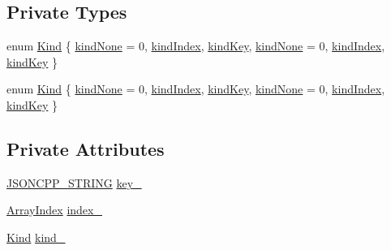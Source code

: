 \subsection*{Private Types}
\begin{DoxyCompactItemize}
\item 
enum \hyperlink{class_json_1_1_path_argument_a2420bbad778573c147e578701b84d9b9}{Kind} \{ \newline
\hyperlink{class_json_1_1_path_argument_a2420bbad778573c147e578701b84d9b9a6db9d0ef9272eb98cb1a7cdad9bf1389}{kind\+None} = 0, 
\hyperlink{class_json_1_1_path_argument_a2420bbad778573c147e578701b84d9b9a8c821a3ddf6dca946359db0159c1f960}{kind\+Index}, 
\hyperlink{class_json_1_1_path_argument_a2420bbad778573c147e578701b84d9b9aac79cd2662fad72c6a5d77e69bc78ae5}{kind\+Key}, 
\hyperlink{class_json_1_1_path_argument_a2420bbad778573c147e578701b84d9b9a6db9d0ef9272eb98cb1a7cdad9bf1389}{kind\+None} = 0, 
\newline
\hyperlink{class_json_1_1_path_argument_a2420bbad778573c147e578701b84d9b9a8c821a3ddf6dca946359db0159c1f960}{kind\+Index}, 
\hyperlink{class_json_1_1_path_argument_a2420bbad778573c147e578701b84d9b9aac79cd2662fad72c6a5d77e69bc78ae5}{kind\+Key}
 \}
\item 
enum \hyperlink{class_json_1_1_path_argument_a2420bbad778573c147e578701b84d9b9}{Kind} \{ \newline
\hyperlink{class_json_1_1_path_argument_a2420bbad778573c147e578701b84d9b9a6db9d0ef9272eb98cb1a7cdad9bf1389}{kind\+None} = 0, 
\hyperlink{class_json_1_1_path_argument_a2420bbad778573c147e578701b84d9b9a8c821a3ddf6dca946359db0159c1f960}{kind\+Index}, 
\hyperlink{class_json_1_1_path_argument_a2420bbad778573c147e578701b84d9b9aac79cd2662fad72c6a5d77e69bc78ae5}{kind\+Key}, 
\hyperlink{class_json_1_1_path_argument_a2420bbad778573c147e578701b84d9b9a6db9d0ef9272eb98cb1a7cdad9bf1389}{kind\+None} = 0, 
\newline
\hyperlink{class_json_1_1_path_argument_a2420bbad778573c147e578701b84d9b9a8c821a3ddf6dca946359db0159c1f960}{kind\+Index}, 
\hyperlink{class_json_1_1_path_argument_a2420bbad778573c147e578701b84d9b9aac79cd2662fad72c6a5d77e69bc78ae5}{kind\+Key}
 \}
\end{DoxyCompactItemize}
\subsection*{Private Attributes}
\begin{DoxyCompactItemize}
\item 
\hyperlink{config_8h_a1e723f95759de062585bc4a8fd3fa4be}{J\+S\+O\+N\+C\+P\+P\+\_\+\+S\+T\+R\+I\+NG} \hyperlink{class_json_1_1_path_argument_af4024368548ff730ef2bed97d6f1ca43}{key\+\_\+}
\item 
\hyperlink{namespace_json_a8048e741f2177c3b5d9ede4a5b8c53c2}{Array\+Index} \hyperlink{class_json_1_1_path_argument_afd5857d1b6bfaae6961333bdae7bd5ec}{index\+\_\+}
\item 
\hyperlink{class_json_1_1_path_argument_a2420bbad778573c147e578701b84d9b9}{Kind} \hyperlink{class_json_1_1_path_argument_ad4bc4b544b155a3d9c7788572ecf991b}{kind\+\_\+}
\end{DoxyCompactItemize}
